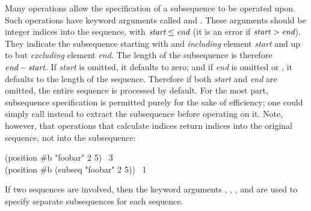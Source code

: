 Many operations allow the specification of a subsequence to be operated
upon.  Such operations have keyword arguments
called  and .  These arguments should be integer indices
into the sequence, with $\emph{start}\leq\emph{end}$
(it is an error if $\emph{start}>\emph{end}$).  They indicate
the subsequence starting with and \emph{including} element \emph{start}
and up to but \emph{excluding} element \emph{end}.  The length of the subsequence
is therefore $\emph{end}-\emph{start}$.  If \emph{start} is omitted,
it defaults to zero; and if \emph{end} is omitted or {\false}, it defaults to
the length of the sequence.
Therefore if both \emph{start} and \emph{end} are omitted, the entire sequence
is processed by default.
For the most part, subsequence specification
is permitted purely for the sake of efficiency;
one could simply call  instead to extract the subsequence
before operating on it.  Note, however, that operations that
calculate indices
return indices into the original sequence, not into the subsequence:
\begin{lisp}
(position \#{\Xbackslash}b "foobar"  2  5) \EV\ 3 \\
(position \#{\Xbackslash}b (subseq "foobar" 2 5)) \EV\ 1
\end{lisp}
If two sequences are involved, then
the keyword arguments
, , , and  are used to
specify separate subsequences for each sequence.


